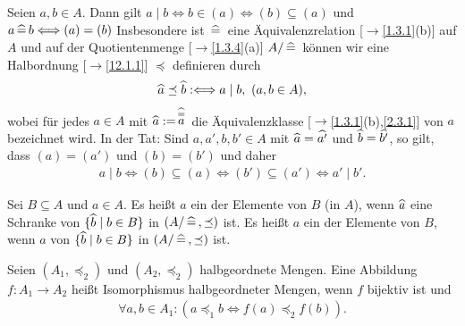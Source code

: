 \documentclass[../../main.tex]{subfiles}
\begin{document}
\begin{bem}\label{16.1.3} 
Seien $a,b\in A$. Dann gilt $a\mid b\Longleftrightarrow b\in (a)\Longleftrightarrow (b)\subseteq (a)$ und $a\,\widehat{=}\, b\Longleftrightarrow (a)=(b)$
Insbesondere ist $\,\widehat{=}\,$ eine Äquivalenzrelation [$\to$\ref{1.3.1}(b)] auf $A$ und auf der Quotientenmenge [$\to$\ref{1.3.4}(a)] $A/\,\widehat{=}\,$ können wir eine Halbordnung [$\to$\ref{12.1.1}] $\preceq$ definieren durch
\begin{align*}
\widehat{a}\preceq \widehat{b}:\Longleftrightarrow a\mid b,\ (a,b\in A),
\end{align*}
wobei für jedes $a\in A$ mit $\widehat{a}:=\stackrel{\,\widehat{=}\,}{a}$ die Äquivalenzklasse [$\to$\ref{1.3.1}(b),\ref{2.3.1}] von $a$ bezeichnet wird. In der Tat: Sind $a,a',b,b'\in A$ mit $\widehat{a}=\widehat{a'}$ und $\widehat{b}=\widehat{b'}$, so gilt, dass $(a)=(a')$ und $(b)=(b')$ und daher
\begin{align*}
a\mid b\Longleftrightarrow (b)\subseteq (a)\Longleftrightarrow (b')\subseteq (a')\Longleftrightarrow a'\mid b'.
\end{align*}
\end{bem}

\begin{df}\label{16.1.4} 
Sei $B\subseteq A$ und $a\in A$. Es heißt $a$ ein  der Elemente von $B$ (in $A$), wenn $\widehat{a}$ eine  Schranke von $\{\widehat{b}\mid b\in B\}$ in $(A/\,\widehat{=}\,, \preceq)$ ist. Es heißt $a$ ein  der Elemente von $B$, wenn $a$  von $\{\widehat{b}\mid b\in B\}$ in $(A/\,\widehat{=}\,, \preceq)$ ist.
\end{df}
	
\begin{df}\label{16.1.5}
Seien $(A_1,\preceq_2)$ und $(A_2,\preceq_2)$ halbgeordnete Mengen. Eine Abbildung $f: A_1\to A_2$ heißt Isomorphismus halbgeordneter Mengen, wenn $f$ bijektiv ist und
\begin{align*}
\forall a,b\in A_1: (a\preceq_1 b\Longleftrightarrow f(a)\preceq_2 f(b)).
\end{align*}
\end{df}
\end{document}
